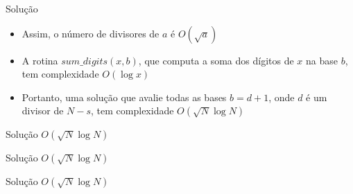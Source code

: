 \begin{frame}[fragile]{Solução}

    \begin{itemize}
         \item Assim, o número de divisores de $a$ é $O(\sqrt{a})$

         \item A rotina $sum\_digits(x, b)$, que computa a soma dos dígitos de $x$ na base $b$, tem
            complexidade $O(\log x)$

        \item Portanto, uma solução que avalie todas as bases $b = d + 1$, onde $d$ é um divisor de
            $N - s$, tem complexidade $O(\sqrt{N}\log N)$
    \end{itemize}

\end{frame}
\begin{frame}[fragile]{Solução $O(\sqrt{N}\log N)$}
\end{frame}

\begin{frame}[fragile]{Solução $O(\sqrt{N}\log N)$}
\end{frame}

\begin{frame}[fragile]{Solução $O(\sqrt{N}\log N)$}
\end{frame}
